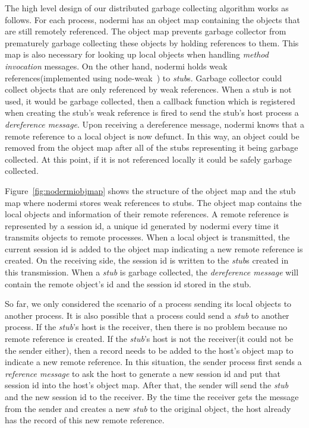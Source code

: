The high level design of our distributed garbage collecting
algorithm works as follows.
For each process, nodermi has an object map containing the objects
that are still remotely referenced.
The object map prevents garbage collector from prematurely garbage collecting
these objects by holding references to them.
This map is also necessary for looking up local objects
when handling \emph{method invocation} messages.
On the other hand, nodermi holds weak references(implemented using node-weak~\cite{nodeweak})
to \emph{stub}s.
Garbage collector could collect objects that are only
referenced by weak references.
When a stub is not used, it would be garbage collected,
then a callback function which is registered when creating
the stub's weak reference is fired to
send the stub's host process a \emph{dereference message}.
Upon receiving a dereference message,
nodermi knows that a remote reference to a local object
is now defunct.
In this way, an object could be removed from the object map after
all of the stubs representing it being garbage collected.
At this point, if it is not referenced locally it could
be safely garbage collected.


\nodermiobjmapfig{}

Figure~\ref{fig:nodermiobjmap} shows the structure of
the object map and the stub map
where nodermi stores weak references to stubs.
The object map contains the local objects and information of
their remote references.
A remote reference is represented by a session id,
a unique id generated by nodermi every time it transmits objects
to remote processes.
When a local object is transmitted, the current session id is added to
the object map indicating a new remote reference is created.
On the receiving side, the session id is written to
the \emph{stub}s created in this transmission.
When a \emph{stub} is garbage collected,
the \emph{dereference message} will contain
the remote object's id and the session id stored
in the stub.


So far, we only considered the scenario of a process sending its local
objects to another process.
It is also possible that a process could send a \emph{stub} to another process.
If the \emph{stub}'s host is the receiver, then there is no problem because no remote
reference is created.
If the \emph{stub}'s host is not the receiver(it could not be the sender either),
then a record needs to be added to the host's object map to indicate
a new remote reference.
In this situation,
the sender process first sends a \emph{reference message} to
ask the host
to generate a new session id
and put that session id into the host's object map.
After that,
the sender will send the \emph{stub} and the new session id
to the receiver.
By the time the receiver gets the message from the sender
and
creates a new \emph{stub} to the original object,
the host already has the record of this new remote reference.

